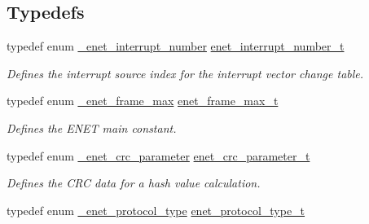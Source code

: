 \subsection*{Typedefs}
\begin{DoxyCompactItemize}
\item 
typedef enum \hyperlink{group__enet__driver_ga5e436b0f66c91117426a2bf7d0cad7ae}{\+\_\+enet\+\_\+interrupt\+\_\+number} \hyperlink{group__enet__driver_gaca37a9c265e502501dc4834e329a7aac}{enet\+\_\+interrupt\+\_\+number\+\_\+t}\hypertarget{group__enet__driver_gaca37a9c265e502501dc4834e329a7aac}{}\label{group__enet__driver_gaca37a9c265e502501dc4834e329a7aac}

\begin{DoxyCompactList}\small\item\em Defines the interrupt source index for the interrupt vector change table. \end{DoxyCompactList}\item 
typedef enum \hyperlink{group__enet__driver_ga9f232f6ffcec5c632ffbdb26312d2925}{\+\_\+enet\+\_\+frame\+\_\+max} \hyperlink{group__enet__driver_ga033b603dc84faee22692db9c5335b981}{enet\+\_\+frame\+\_\+max\+\_\+t}\hypertarget{group__enet__driver_ga033b603dc84faee22692db9c5335b981}{}\label{group__enet__driver_ga033b603dc84faee22692db9c5335b981}

\begin{DoxyCompactList}\small\item\em Defines the E\+N\+ET main constant. \end{DoxyCompactList}\item 
typedef enum \hyperlink{group__enet__driver_ga105b06cb7053167fbb1b5cf300cb88f1}{\+\_\+enet\+\_\+crc\+\_\+parameter} \hyperlink{group__enet__driver_gaa5e85615b1b157b8c1a463eb7b3531e5}{enet\+\_\+crc\+\_\+parameter\+\_\+t}\hypertarget{group__enet__driver_gaa5e85615b1b157b8c1a463eb7b3531e5}{}\label{group__enet__driver_gaa5e85615b1b157b8c1a463eb7b3531e5}

\begin{DoxyCompactList}\small\item\em Defines the C\+RC data for a hash value calculation. \end{DoxyCompactList}\item 
typedef enum \hyperlink{group__enet__driver_ga5a2b9b8d2c6555ab938f39fb048f6a68}{\+\_\+enet\+\_\+protocol\+\_\+type} \hyperlink{group__enet__driver_gaa298174631e9be6a0333a1208c1af9cc}{enet\+\_\+protocol\+\_\+type\+\_\+t}\hypertarget{group__enet__driver_gaa298174631e9be6a0333a1208c1af9cc}{}\label{group__enet__driver_gaa298174631e9be6a0333a1208c1af9cc}


\end{DoxyCompactItemize}
